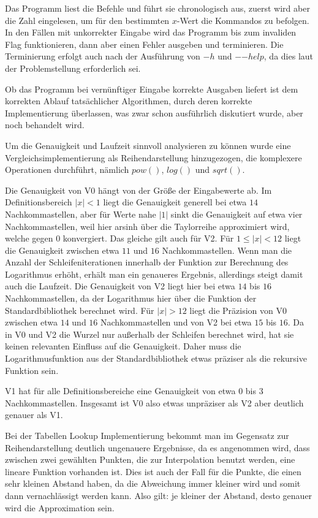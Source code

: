 \documentclass[course=erap]{aspdoc}
\begin{document}
  Das Programm liest die Befehle und führt sie chronologisch aus, zuerst wird aber die Zahl eingelesen, um für den bestimmten $x$-Wert die Kommandos zu befolgen. In den Fällen mit unkorrekter Eingabe wird das Programm bis zum invaliden Flag funktionieren, dann aber einen Fehler ausgeben und terminieren. Die Terminierung erfolgt auch nach der Ausführung von $-h$ und $-$$-$$help$, da dies laut der Problemstellung erforderlich sei.

  Ob das Programm bei vernünftiger Eingabe korrekte Ausgaben liefert ist dem korrekten Ablauf tatsächlicher Algorithmen, durch deren korrekte Implementierung überlassen, was zwar schon ausführlich diskutiert wurde, aber noch behandelt wird.
 
 Um die Genauigkeit und Laufzeit sinnvoll analysieren zu können wurde eine Vergleichsimplementierung als Reihendarstellung hinzugezogen, die komplexere Operationen durchführt, nämlich $pow()$, $log()$ und $sqrt()$.
 
 Die Genauigkeit von V0 hängt von der Größe der Eingabewerte ab. Im Definitionsbereich $|x|<1$ liegt die Genauigkeit generell bei etwa $14$ Nachkommastellen, aber für Werte nahe $|1|$ sinkt die Genauigkeit auf etwa vier Nachkommastellen,
weil hier arsinh über die Taylorreihe approximiert wird, welche gegen $0$ konvergiert. Das gleiche gilt auch für V2.
Für $1\leq|x|<12$ liegt die Genauigkeit zwischen etwa $11$ und $16$ Nachkommastellen. Wenn man die Anzahl der Schleifeniterationen innerhalb der Funktion zur Berechnung des Logarithmus erhöht, erhält man ein genaueres Ergebnis, allerdings
steigt damit auch die Laufzeit. Die Genauigkeit von V2 liegt hier bei etwa $14$ bis $16$ Nachkommastellen, da der Logarithmus hier über die Funktion der Standardbibliothek berechnet wird.
Für $|x|>12$ liegt die Präzision von V0 zwischen etwa $14$ und $16$ Nachkommastellen und von V2 bei etwa $15$ bis $16$. Da in V0 und V2 die Wurzel nur außerhalb der Schleifen berechnet wird, hat sie keinen
relevanten Einfluss auf die Genauigkeit. Daher muss die Logarithmusfunktion aus der Standardbibliothek etwas präziser als die rekursive Funktion sein.

V1 hat für alle Definitionsbereiche eine Genauigkeit von etwa $0$ bis $3$ Nachkommastellen. 
Insgesamt ist V0 also etwas unpräziser als V2 aber deutlich genauer als V1.

Bei der Tabellen Lookup Implementierung bekommt man im Gegensatz zur Reihendarstellung  deutlich ungenauere Ergebnisse, da es angenommen wird, dass zwischen zwei gewählten Punkten, die zur Interpolation benutzt werden, eine lineare Funktion vorhanden ist. Dies ist auch der Fall für die Punkte, die einen sehr kleinen Abstand haben, da die Abweichung immer kleiner wird und somit dann vernachlässigt werden kann. Also gilt: je kleiner der Abstand, desto genauer wird die Approximation sein. 
\end{document}

